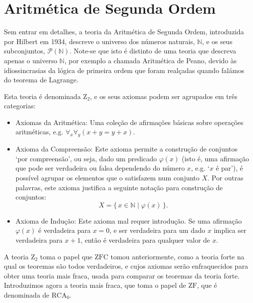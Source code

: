 \section*{Aritmética de Segunda Ordem}

Sem entrar em detalhes, a teoria da Aritmética de Segunda Ordem, introduzida por Hilbert em 1934, descreve o universo dos números naturais, $\mathbb{N}$, e os seus subconjuntos, $\mathcal{P}(\mathbb{N})$. Note-se que isto é distinto de uma teoria que descreva apenas o universo $\mathbb{N}$, por exemplo a chamada Aritmética de Peano, devido às idiossincrasias da lógica de primeira ordem que foram realçadas quando falámos do teorema de Lagrange.

Esta teoria é denominada $\mathrm{Z}_2$, e os seus axiomas podem ser agrupados em três categorias:
\begin{itemize}
\item Axiomas da Aritmética: Uma coleção de afirmações básicas sobre operações aritméticas, e.g. $\forall_x \forall_y (x+y=y+x)$.
\item Axioma da Compreensão: Este axioma permite a construção de conjuntos `por compreensão', ou seja, dado um predicado $\varphi(x)$ (isto é, uma afirmação que pode ser verdadeira ou falsa dependendo do número $x$, e.g. `$x$ é par'), é possível agrupar os elementos que o satisfazem num conjunto $X$. Por outras palavras, este axioma justifica a seguinte notação para construção de conjuntos:
\begin{equation}
X = \{\, x \in \mathbb{N} \mid \varphi(x)\,\}.
\end{equation}
\item Axioma de Indução: Este axioma mal requer introdução. Se uma afirmação $\varphi(x)$ é verdadeira para $x = 0$, e ser verdadeira para um dado $x$ implica ser verdadeira para $x+1$, então é verdadeira para qualquer valor de $x$.
\end{itemize}

A teoria $\mathrm{Z}_2$ toma o papel que $\mathrm{ZFC}$ tomou anteriormente, como a teoria forte na qual os teoremas são todos verdadeiros, e cujos axiomas serão enfraquecidos para obter uma teoria mais fraca, usada para comparar os teoremas da teoria forte. Introduzimos agora a teoria mais fraca, que toma o papel de $\mathrm{ZF}$, que é denominada de $\mathrm{RCA}_0$.

